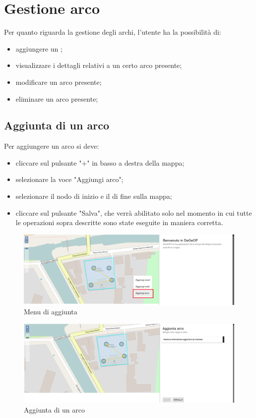 \section{Gestione arco}
Per quanto riguarda la gestione degli archi, l'utente ha la possibilità di:
\begin{itemize}
	\item aggiungere un ;
	\item visualizzare i dettagli relativi a un certo arco presente;
	\item modificare un arco presente;
	\item eliminare un arco presente;
\end{itemize}

\subsection{Aggiunta di un arco}
Per aggiungere un arco si deve:
\begin{itemize}
	\item cliccare sul pulsante "+" in basso a destra della mappa;
	\item selezionare la voce "Aggiungi arco";
	\item selezionare il nodo di inizio e il  di fine sulla mappa;
	\item cliccare sul pulsante "Salva", che verrà abilitato solo nel momento in cui tutte le operazioni sopra descritte sono state eseguite in maniera corretta.
\end{itemize}

\begin{figure}[H]
\centering
\includegraphics[width=\textwidth]{img/menu_aperto_arco_hover.png}
\caption{Menu di aggiunta}
\end{figure}

\begin{figure}[H]
\centering
\includegraphics[width=\textwidth]{img/aggiunta_arco.png}
\caption{Aggiunta di un arco}
\end{figure}

